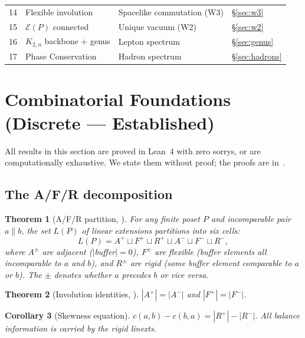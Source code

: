 \documentclass[11pt]{article}
\newtheorem{theorem}{Theorem}[section]
\newtheorem{corollary}[theorem]{Corollary}
\begin{document}
\begin{longtable}{@{}clll@{}}
14 & Flexible involution &
  Spacelike commutation (W3) &
  \S\ref{sec:w3} \\

15 & $\mathcal{E}(P)$ connected &
  Unique vacuum (W2) &
  \S\ref{sec:w2} \\

16 & $K_{2,n}$ backbone + genus &
  Lepton spectrum &
  \S\ref{sec:genus} \\

17 & Phase Conservation &
  Hadron spectrum &
  \S\ref{sec:hadrons} \\
\bottomrule
\end{longtable}

\section{Combinatorial Foundations (Discrete --- Established)}
\label{sec:foundations}

All results in this section are proved in Lean~4 with zero
sorrys, or are computationally exhaustive.  We state them
without proof; the proofs are in~\cite{SilvaAlvarado26}.

\subsection{The A/F/R decomposition}
\label{sec:afr}

\begin{theorem}[A/F/R partition, {\cite{SilvaAlvarado26}}]
\label{thm:afr}
For any finite poset $P$ and incomparable pair $a \parallel b$,
the set $L(P)$ of linear extensions partitions into six cells:
\[
  L(P) = A^+ \sqcup F^+ \sqcup R^+
       \sqcup A^- \sqcup F^- \sqcup R^-,
\]
where $A^\pm$ are \emph{adjacent} ($|$buffer$| = 0$),
$F^\pm$ are \emph{flexible} (buffer elements all incomparable
to $a$ and $b$), and $R^\pm$ are \emph{rigid} (some buffer
element comparable to $a$ or $b$).  The $\pm$ denotes
whether $a$ precedes $b$ or vice versa.
\end{theorem}

\begin{theorem}[Involution identities, {\cite{SilvaAlvarado26}}]
\label{thm:involution}
$|A^+| = |A^-|$ and $|F^+| = |F^-|$.
\end{theorem}

\begin{corollary}[Skewness equation]
\label{cor:skewness}
$c(a,b) - c(b,a) = |R^+| - |R^-|$.
All balance information is carried by the rigid linexts.
\end{corollary}
\end{document}
